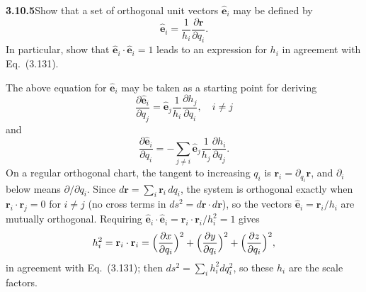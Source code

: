 \par\bigskip
\noindent\textbf{3.10.5}\quad Show that a set of orthogonal unit vectors
$\hat{\mathbf{e}}_{i}$ may be defined by
\[
\hat{\mathbf{e}}_{i}=\frac{1}{h_{i}}\frac{\partial\mathbf{r}}{\partial q_{i}}.
\]
In particular, show that $\hat{\mathbf{e}}_{i}\cdot\hat{\mathbf{e}}_{i}=1$
leads to an expression for $h_{i}$ in agreement with Eq.~(3.131).

The above equation for $\hat{\mathbf{e}}_{i}$ may be taken as a starting point
for deriving
\[
\frac{\partial\hat{\mathbf{e}}_{i}}{\partial q_{j}}
=\hat{\mathbf{e}}_{j}\frac{1}{h_{i}}\frac{\partial h_{j}}{\partial q_{i}},
\quad i\neq j
\]
and
\[
\frac{\partial\hat{\mathbf{e}}_{i}}{\partial q_{i}}
=-\sum_{j\neq i}\hat{\mathbf{e}}_{j}\frac{1}{h_{j}}
\frac{\partial h_{i}}{\partial q_{j}}.
\]
\solution
On a regular orthogonal chart, the tangent to increasing $q_i$ is
$\mathbf r_i=\partial_{q_i}\mathbf r$, and $\partial_i$ below means
$\partial/\partial q_i$. Since
$d\mathbf r=\sum_i\mathbf r_i\,dq_i$, the system is orthogonal exactly
when $\mathbf r_i\cdot\mathbf r_j=0$ for $i\ne j$ (no cross terms in
$ds^2=d\mathbf r\cdot d\mathbf r$), so the vectors
$\hat{\mathbf e}_i=\mathbf r_i/h_i$ are mutually orthogonal. Requiring
$\hat{\mathbf e}_i\cdot\hat{\mathbf e}_i=\mathbf r_i\cdot\mathbf r_i/h_i^2=1$
gives
\[
h_i^2=\mathbf r_i\cdot\mathbf r_i
=\Bigl(\frac{\partial x}{\partial q_i}\Bigr)^2
+\Bigl(\frac{\partial y}{\partial q_i}\Bigr)^2
+\Bigl(\frac{\partial z}{\partial q_i}\Bigr)^2,
\]
in agreement with Eq.~(3.131); then
$ds^2=\sum_ih_i^2dq_i^2$, so these $h_i$ are the scale factors.

